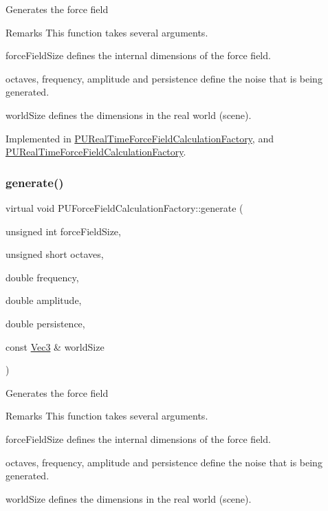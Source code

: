 Generates the force field \begin{DoxyRemark}{Remarks}
This function takes several arguments.
\begin{DoxyItemize}
\item force\+Field\+Size defines the internal dimensions of the force field.
\item octaves, frequency, amplitude and persistence define the noise that is being generated.
\item world\+Size defines the dimensions in the real world (scene). 
\end{DoxyItemize}
\end{DoxyRemark}


Implemented in \hyperlink{classPURealTimeForceFieldCalculationFactory_a009d7bb7e28b4995a1600b3b1ac3895e}{P\+U\+Real\+Time\+Force\+Field\+Calculation\+Factory}, and \hyperlink{classPURealTimeForceFieldCalculationFactory_ac698047a4841663680ed761857e9ae20}{P\+U\+Real\+Time\+Force\+Field\+Calculation\+Factory}.

\mbox{\label{classPUForceFieldCalculationFactory_a8292a8ec09320a66c6ef130e98a7fd90}} 
\subsubsection{\texorpdfstring{generate()}{generate()}\hspace{0.1cm}{\footnotesize\ttfamily [2/2]}}
{\footnotesize\ttfamily virtual void P\+U\+Force\+Field\+Calculation\+Factory\+::generate (\begin{DoxyParamCaption}\item[{unsigned int}]{force\+Field\+Size,  }\item[{unsigned short}]{octaves,  }\item[{double}]{frequency,  }\item[{double}]{amplitude,  }\item[{double}]{persistence,  }\item[{const \hyperlink{classVec3}{Vec3} \&}]{world\+Size }\end{DoxyParamCaption})\hspace{0.3cm}{\ttfamily [pure virtual]}}

Generates the force field \begin{DoxyRemark}{Remarks}
This function takes several arguments.
\begin{DoxyItemize}
\item force\+Field\+Size defines the internal dimensions of the force field.
\item octaves, frequency, amplitude and persistence define the noise that is being generated.
\item world\+Size defines the dimensions in the real world (scene). 
\end{DoxyItemize}
\end{DoxyRemark}


